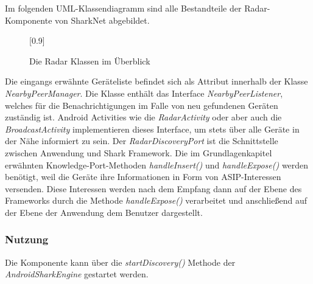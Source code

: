 \label{ch:radaroverview}
Im folgenden UML-Klassendiagramm sind alle Bestandteile der Radar-Komponente von SharkNet abgebildet.
\begin{figure}[H]
	\centering
	\scalebox{1}[0.9]{}
	\caption{Die Radar Klassen im Überblick}
	\label{fig:radarhAll}
\end{figure}
Die eingangs erwähnte Geräteliste befindet sich als Attribut innerhalb der Klasse \textit{Nearby\-Peer\-Manager}. Die Klasse enthält das Interface \textit{NearbyPeerListener}, welches für die Benachrichtigungen im Falle von neu gefundenen Geräten zuständig ist. Android Activities wie die \textit{RadarActivity} oder aber auch die \textit{BroadcastActivity} implementieren dieses Interface, um stets über alle Geräte in der Nähe informiert zu sein. Der \textit{RadarDiscoveryPort} ist die Schnittstelle zwischen Anwendung und Shark Framework. Die im Grundlagenkapitel erwähnten Knowledge-Port-Methoden \textit{handleInsert()} und \textit{handleExpose()} werden benötigt, weil die Geräte ihre Informationen in Form von ASIP-Interessen versenden. Diese Interessen werden nach dem Empfang dann auf der Ebene des Frameworks durch die Methode \textit{handleExpose()} verarbeitet und anschließend auf der Ebene der Anwendung dem Benutzer dargestellt.

\subsubsection{Nutzung}
Die Komponente kann über die \textit{startDiscovery()} Methode der \textit{AndroidSharkEngine} gestartet werden.

